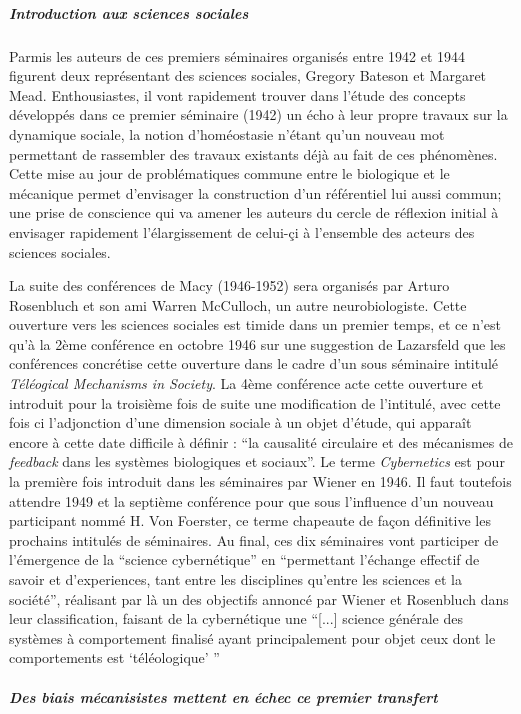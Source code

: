 \subparagraph{Introduction aux sciences sociales}
Parmis les auteurs de ces premiers séminaires organisés entre 1942 et 1944 figurent deux représentant des sciences sociales, Gregory Bateson et Margaret Mead. Enthousiastes, il vont rapidement trouver dans l'étude des concepts développés dans ce premier séminaire (1942) un écho à leur propre travaux sur la dynamique sociale, la notion d'homéostasie n'étant qu'un nouveau mot permettant de rassembler des travaux existants déjà au fait de ces phénomènes. Cette mise au jour de problématiques commune entre le biologique et le mécanique permet d'envisager la construction d'un référentiel lui aussi commun; une prise de conscience qui va amener les auteurs du cercle de réflexion initial à envisager rapidement l'élargissement de celui-çi à l'ensemble des acteurs des sciences sociales.

La suite des conférences de Macy (1946-1952) sera organisés par Arturo Rosenbluch et son ami Warren McCulloch, un autre neurobiologiste. Cette ouverture vers les sciences sociales est timide dans un premier temps, et ce n'est qu'à la 2ème conférence en octobre 1946 sur une suggestion de Lazarsfeld que les conférences concrétise cette ouverture dans le cadre d'un sous séminaire intitulé \textit{Téléogical Mechanisms in Society}. La 4ème conférence acte cette ouverture et introduit pour la troisième fois de suite une modification de l'intitulé, avec cette fois ci l'adjonction d'une dimension sociale à un objet d'étude, qui apparaît encore à cette date difficile à définir : \enquote{la causalité circulaire et des mécanismes de \textit{feedback} dans les systèmes biologiques et sociaux}. Le terme \textit{Cybernetics} est pour la première fois introduit dans les séminaires par Wiener en 1946. Il faut toutefois attendre 1949 et la septième conférence pour que sous l'influence d'un nouveau participant nommé H. Von Foerster, ce terme chapeaute de façon définitive les prochains intitulés de séminaires. Au final, ces dix séminaires vont participer de l'émergence de la \enquote{science cybernétique} en \enquote{permettant l'échange effectif de savoir et d'experiences, tant entre les disciplines qu'entre les sciences et la société}, réalisant par là un des objectifs annoncé par Wiener et Rosenbluch dans leur classification, faisant de la cybernétique une \enquote{[...] science générale des systèmes à comportement finalisé ayant principalement pour objet ceux dont le comportements est \enquote{téléologique} } \autocite{Pouvreau2013}

\subparagraph{Des biais mécanisistes mettent en échec ce premier transfert}

